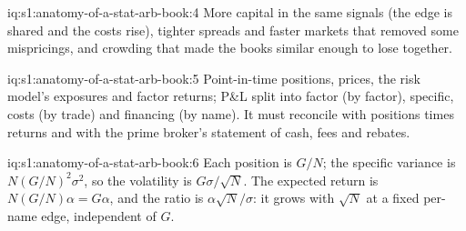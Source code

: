 \begin{solution}{iq:s1:anatomy-of-a-stat-arb-book:4}
More capital in the same signals (the edge is shared and the costs rise), tighter spreads and faster markets that removed some mispricings, and crowding that
made the books similar enough to lose together.
\end{solution}

\begin{solution}{iq:s1:anatomy-of-a-stat-arb-book:5}
Point-in-time positions, prices, the risk model's exposures and factor returns; P\&L split into factor (by factor), specific, costs (by trade) and financing (by
name). It must reconcile with positions times returns and with the prime broker's statement of cash, fees and rebates.
\end{solution}

\begin{solution}{iq:s1:anatomy-of-a-stat-arb-book:6}
Each position is $G/N$; the specific variance is $N (G/N)^2 \sigma^2$, so the volatility is $G\sigma/\sqrt N$. The expected return is $N (G/N)\alpha = G\alpha$,
and the ratio is $\alpha\sqrt N/\sigma$: it grows with $\sqrt N$ at a fixed per-name edge, independent of $G$.
\end{solution}
